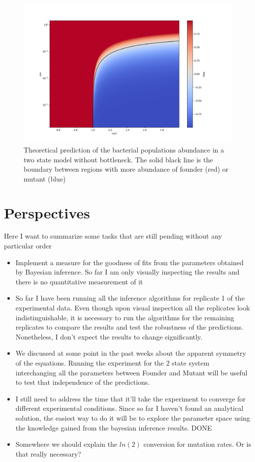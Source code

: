 \documentclass[10pt,a4paper]{scrartcl}
\begin{document}
\begin{figure}[H]
	\centering
	\includegraphics[scale=0.5]{plots/theoretical_fate.png}
	\caption{Theoretical prediction of the bacterial populations abundance in a two state model without bottleneck. The solid black line is the boundary between regions with more abundance of founder (red) or mutant (blue)}
	\label{fig:parameter_space_2st_no_bottleneck}
\end{figure}



\section{Perspectives}
Here I want to summarize some tasks that are still pending without any particular order
\begin{itemize}
    \item Implement a measure for the goodness of fits from the parameters obtained by Bayesian inference. So far I am only visually inspecting the results and there is no quantitative measurement of it
    \item So far I have been running all the inference algorithms for replicate 1 of the experimental data. Even though upon visual inspection all the replicates look indistinguishable, it is necessary to run the algorithms for the remaining replicates to compare the results and test the robustness of the predictions. Nonetheless, I don't expect the results to change significantly.
    \item We discussed at some point in the past weeks about the apparent symmetry of the equations. Running the experiment for the 2 state system interchanging all the parameters between Founder and Mutant will be useful to test that independence of the predictions.%
    \item I still need to address the time that it'll take the experiment to converge for different experimental conditions. Since so far I haven't found an analytical solution, the easiest way to do it will be to explore the parameter space using the knowledge gained from the bayesian inference results. DONE
    \item Somewhere we should explain the $ln(2)$ conversion for mutation rates. Or is that really necessary?
\end{itemize}

\ \newpage


\end{document}
